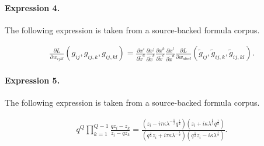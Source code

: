 \documentclass[11pt]{article}
\begin{document}
\paragraph{Expression 4.} The following expression is taken from a source-backed formula corpus.

\begin{align*}\frac{\partial L}{\partial w_{ijkl}}(g_{ij},g_{ij,k},g_{ij,kl})=\frac{\partial x^i}{\partial \tilde{x}^a}\frac{\partial x^j}{\partial \tilde{x}^b}\frac{\partial x^k}{\partial \tilde{x}^c}\frac{\partial x^l}{\partial \tilde{x}^d}\frac{\partial L}{\partial w_{abcd}}(\tilde{g}_{ij},\tilde{g}_{ij,k},\tilde{g}_{ij,kl}).\end{align*}

\paragraph{Expression 5.} The following expression is taken from a source-backed formula corpus.

\begin{align*}q^{Q}\prod_{k=1}^{Q-1}\frac{qz_i-z_k}{z_i-qz_k} = \frac{\left(z_i-i\tau\kappa \lambda^{-\frac{1}{2}}q^{\frac{1}{2}}\right) \left(z_i +i\kappa \lambda^{\frac{1}{2}}q^{\frac{1}{2}}\right)} {\left(q^{\frac{1}{2}}z_i+i\tau\kappa\lambda^{-\frac{1}{2}}\right) \left(q^{\frac{1}{2}}z_i-i\kappa\lambda^{\frac{1}{2}}\right)}.\end{align*}
\end{document}
